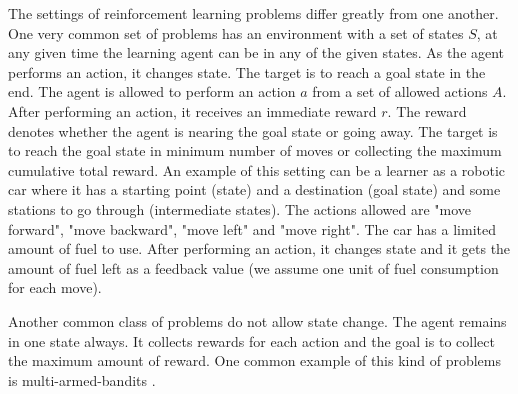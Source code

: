 \documentclass[english]{tktltiki}
\begin{document}
The settings of reinforcement learning problems differ greatly from  one another. One very common set of problems has an environment with a set of states $S$, at any given time the learning agent can be in any of the given states. As the agent performs an action, it changes state. The target is to reach a goal state in the end. The agent is allowed to perform an action $a$ from a set of allowed actions $A$. After performing an action, it receives an immediate reward $r$. The reward denotes whether the agent is nearing the goal state or going away. The target is to reach the goal state in minimum number of moves or collecting the maximum cumulative total reward. An example of this setting can be a learner as a robotic car where it has a starting point (state) and a destination (goal state) and some stations to go through (intermediate states). The actions allowed are "move forward", "move backward", "move left" and "move right". The car has a limited amount of fuel to use. After performing an action, it changes state and it gets the amount of fuel left as a feedback value (we assume one unit of fuel consumption for each move).

Another common class of problems do not allow state change. The agent remains in one state always. It collects rewards for each action and the goal is to collect the maximum amount of reward. One common example of this kind of problems is multi-armed-bandits \cite{bandits}.
\end{document}
